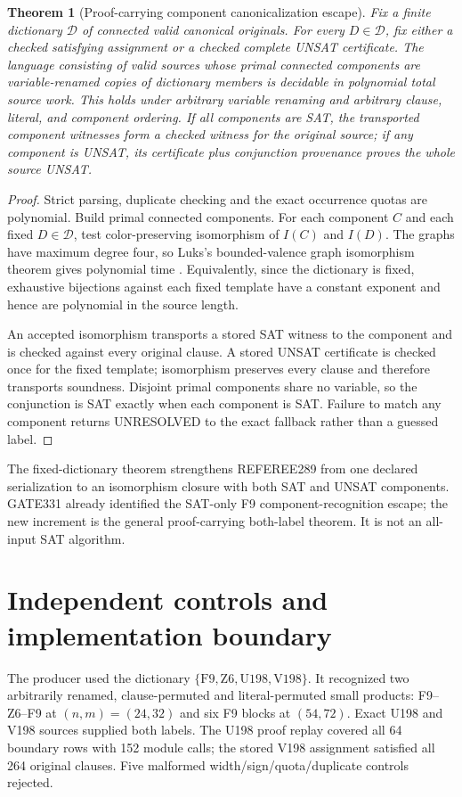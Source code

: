 \documentclass[11pt]{article}
\newtheorem{theorem}{Theorem}
\begin{document}
\begin{theorem}[Proof-carrying component canonicalization escape]
Fix a finite dictionary $\mathcal D$ of connected valid canonical originals.
For every $D\in\mathcal D$, fix either a checked satisfying assignment or a
checked complete UNSAT certificate.  The language consisting of valid sources
whose primal connected components are variable-renamed copies of dictionary
members is decidable in polynomial total source work.  This holds under
arbitrary variable renaming and arbitrary clause, literal, and component
ordering.  If all components are SAT, the transported component witnesses form
a checked witness for the original source; if any component is UNSAT, its
certificate plus conjunction provenance proves the whole source UNSAT.
\end{theorem}
\begin{proof}
Strict parsing, duplicate checking and the exact occurrence quotas are
polynomial.  Build primal connected components.  For each component $C$ and
each fixed $D\in\mathcal D$, test color-preserving isomorphism of $I(C)$ and
$I(D)$.  The graphs have maximum degree four, so Luks's bounded-valence graph
isomorphism theorem gives polynomial time \cite{luks1982}.  Equivalently, since
the dictionary is fixed, exhaustive bijections against each fixed template
have a constant exponent and hence are polynomial in the source length.

An accepted isomorphism transports a stored SAT witness to the component and
is checked against every original clause.  A stored UNSAT certificate is
checked once for the fixed template; isomorphism preserves every clause and
therefore transports soundness.  Disjoint primal components share no variable,
so the conjunction is SAT exactly when each component is SAT.  Failure to
match any component returns UNRESOLVED to the exact fallback rather than a
guessed label.
\end{proof}

The fixed-dictionary theorem strengthens REFEREE289 from one declared
serialization to an isomorphism closure with both SAT and UNSAT components.
GATE331 already identified the SAT-only F9 component-recognition escape; the
new increment is the general proof-carrying both-label theorem.  It is not an
all-input SAT algorithm.

\section{Independent controls and implementation boundary}
The producer used the dictionary
$\{\mathrm{F9},\mathrm{Z6},\mathrm{U198},\mathrm{V198}\}$.  It recognized two
arbitrarily renamed, clause-permuted and literal-permuted small products:
F9--Z6--F9 at $(n,m)=(24,32)$ and six F9 blocks at $(54,72)$.  Exact U198 and
V198 sources supplied both labels.  The U198 proof replay covered all 64
boundary rows with 152 module calls; the stored V198 assignment satisfied all
264 original clauses.  Five malformed width/sign/quota/duplicate controls
rejected.
\end{document}
